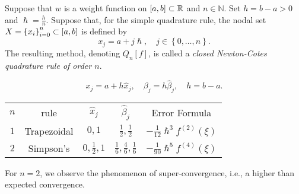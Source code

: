 \begin{frame}
	\begin{definition}
		Suppose that $w$ is a weight function on
		\begin{math}
			\left[a,b\right]\subset
			\mathbb{R}
		\end{math}
		and $n\in\mathbb{N}$.
		Set $h=b-a>0$ and $\hslash=\frac{h}{n}$.
		Suppose that, for the simple quadrature rule, the nodal set
		$X={\left\{x_{i}\right\}}_{i=0}^{n}\subset\left[a,b\right]$ is defined by
		\begin{equation*}
			x_{j}=
			a+j\hslash,\quad
			j\in\left\{0,\dotsc,n\right\}.
		\end{equation*}
		The resulting method, denoting $Q_{n}\left[f\right]$, is
		called a \emph{closed Newton-Cotes quadrature rule of order $n$}.
	\end{definition}

	\begin{example}[Newton-Cotes quadrature rules of order $n=1,2$ and weight function $w\equiv 1$ on $\interval$]
		\begin{equation*}
			x_{j}=
			a+h\widehat{x}_{j},\quad
			\beta_{j}=h\widehat{\beta}_{j},\quad
			h=b-a.
		\end{equation*}

		\begin{table}[ht!]
			\centering
			\begin{tabular}{ccccc}
				\hline
				$n$ & rule                                                         & $\widehat{x}_{j}$ & $\widehat{\beta}_{j}$
				    & Error Formula                                                                                                              \\
				$1$ & Trapezoidal                                                  & $0,1$             & $\frac{1}{2}, \frac{1}{2}$
				    & $-\frac{1}{12}\hslash^{3}f^{\left(2\right)}\left(\xi\right)$                                                               \\
				$2$ & Simpson's                                                    & $0,\frac{1}{2},1$ & $\frac{1}{6}, \frac{4}{6}, \frac{1}{6}$
				    & $-\frac{1}{90}\hslash^{5}f^{\left(4\right)}\left(\xi\right)$                                                               \\
				\hline
			\end{tabular}
		\end{table}
		For $n=2$, we observe the phenomenon of
		\alert{super-convergence}, i.e., a higher than expected convergence.


\end{example}
\end{frame}
